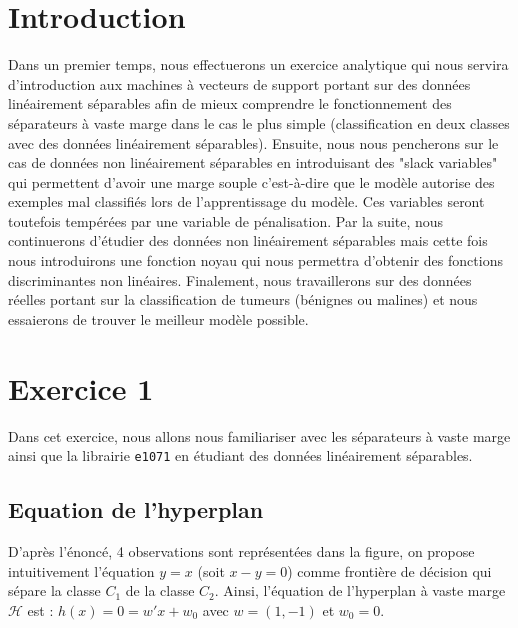 \documentclass{article}
\begin{document}
\begin{multicols}{2}

\section{Introduction}\label{sec:intro}

Dans un premier temps, nous effectuerons un exercice analytique qui nous servira
d'introduction aux machines à vecteurs de support portant sur des
données linéairement séparables afin de mieux comprendre le fonctionnement des
séparateurs à vaste marge dans le cas le plus simple (classification en deux
classes avec des données linéairement séparables).
Ensuite, nous nous pencherons sur le cas de données non linéairement séparables
en introduisant des "slack variables" qui permettent d'avoir une marge souple
c'est-à-dire que le modèle autorise des exemples mal classifiés lors de
l'apprentissage du modèle. Ces variables seront toutefois tempérées par une
variable de pénalisation.
Par la suite, nous continuerons d'étudier des données non linéairement
séparables mais cette fois nous introduirons une fonction noyau qui nous
permettra d'obtenir des fonctions discriminantes non linéaires.
Finalement, nous travaillerons sur des données réelles portant sur la
classification de tumeurs (bénignes ou malines) et nous essaierons de trouver
le meilleur modèle possible.


\section{Exercice 1}\label{sec:ex1}

Dans cet exercice, nous allons nous familiariser avec les séparateurs à vaste
marge ainsi que la librairie \texttt{e1071} en étudiant des données
linéairement séparables.

\subsection{Equation de l'hyperplan}\label{subsec:ex11}

D'après l'énoncé, 4 observations sont représentées dans la figure, on propose
intuitivement l’équation $y = x$ (soit $x - y = 0$) comme frontière de décision
qui sépare la classe $C_1$ de la classe $C_2$. Ainsi, l’équation de l’hyperplan
à vaste marge $\mathcal{H}$ est : $h(x) = 0 = w'x + w_0$ avec $w = (1,-1)$ et
$w_0 = 0$.


\end{multicols}
\end{document}
